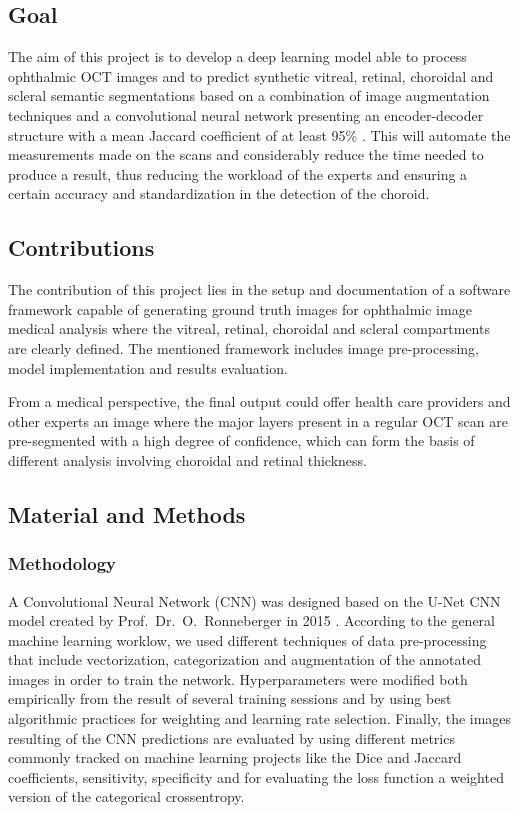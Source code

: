 \documentclass[12pt,a4paper]{scrartcl}
\begin{document}
\subsection{Goal}
The aim of this project is to develop a deep learning model able to process  ophthalmic  OCT  images  and to predict  synthetic  vitreal,  retinal,  choroidal  and  scleral  semantic  segmentations  based  on  a  combination  of  image  augmentation  techniques  and  a convolutional neural network presenting an encoder-decoder structure with a mean Jaccard coefficient of at least 95\%   \cite{Maloca2019}. This will automate the measurements made on the scans and considerably reduce the time needed to produce a result, thus reducing the workload of the experts and ensuring a certain accuracy and standardization in the detection of the choroid. 

\subsection{Contributions}

The contribution of this project lies in the setup and documentation of a software framework capable of generating ground truth images for ophthalmic image medical analysis where the vitreal, retinal, choroidal and scleral compartments are clearly defined. The mentioned framework includes image pre-processing, model implementation and results evaluation. 

From a medical perspective, the final output could offer health care providers and other experts an image where the major layers present in a regular OCT scan are pre-segmented with a high degree of confidence, which can form the basis of different analysis involving choroidal and retinal thickness. 

\subsection{Material and Methods}

\subsubsection{Methodology}

A Convolutional Neural Network (CNN) was designed based on the U-Net CNN model created by Prof.~Dr.~O.~Ronneberger in 2015 \cite{Ronneberger2015}. According to the general machine learning worklow, we used different techniques of data pre-processing that include vectorization, categorization and augmentation of the annotated images in order to train the network. Hyperparameters were modified both empirically from the result of several training sessions and by using best algorithmic practices for weighting and learning rate selection. Finally, the images resulting of the CNN predictions are evaluated by using different metrics commonly tracked on machine learning projects like the Dice and Jaccard coefficients, sensitivity, specificity and for evaluating the loss function a weighted version of the categorical crossentropy. 
\end{document}
